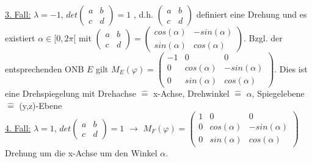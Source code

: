\documentclass[a4paper]{article}
\newcommand{\ul}{\underline}
\let\phi\varphi
\begin{document}
\ul{3. Fall:} \(\lambda=-1\), \(det\begin{pmatrix}
a & b\\
c & d
\end{pmatrix}=1\) , d.h. \(\begin{pmatrix}
a & b\\
c & d
\end{pmatrix}\) definiert eine Drehung und es existiert \(\alpha\in[0,2\pi[\) mit \(\begin{pmatrix}
a & b\\
c & d
\end{pmatrix}=\begin{pmatrix}
cos(\alpha) & -sin(\alpha)\\
sin(\alpha) & cos(\alpha)
\end{pmatrix}\). Bzgl. der entsprechenden ONB \(E\) gilt \(M_E(\phi)=\begin{pmatrix}
-1 & 0 & 0\\
0 & cos(\alpha) & -sin(\alpha)\\
0 & sin(\alpha) & cos(\alpha)
\end{pmatrix}\). Dies ist eine Drehspiegelung mit Drehachse \(\hat{=}\) x-Achse, Drehwinkel \(\hat{=}\) \(\alpha\), Spiegelebene \(\hat{=}\) (y,z)-Ebene\\
\ul{4. Fall:} \(\lambda=1\), \(det\begin{pmatrix}
a & b\\
c & d
\end{pmatrix}=1\) \(\rightarrow\) \(M_F(\phi)=\begin{pmatrix}
1 & 0 & 0\\
0 & cos(\alpha) & -sin(\alpha)\\
0 & sin(\alpha) & cos(\alpha)
\end{pmatrix}\) Drehung um die x-Achse um den Winkel \(\alpha\).
\end{document}
